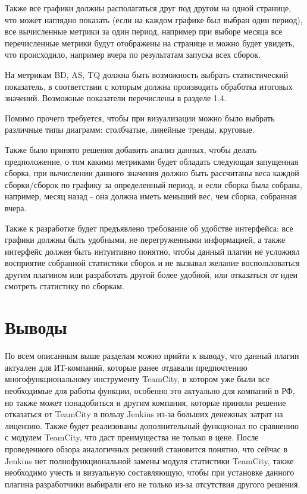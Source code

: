 Также все графики должны располагаться друг под другом на одной странице, что может наглядно показать (если на каждом графике был выбран один период), все вычисленные метрики за один период, например при выборе месяца все перечисленные метрики будут отображены на странице и можно будет увидеть, что происходило, например вчера по результатам запуска всех сборок.

На метрикам BD, AS, TQ должна быть возможность выбрать статистический показатель, в соответствии с которым должна производить обработка итоговых значений. Возможные показатели перечислены в разделе 1.4.

Помимо прочего требуется, чтобы при визуализации можно было выбрать различные типы диаграмм: столбчатые, линейные тренды, круговые.

Также было принято решения добавить анализ данных, чтобы делать предположение, о том какими метриками будет обладать следующая запущенная сборка, при вычислении данного значения должно быть рассчитаны веса каждой сборки/сборок по графику за определенный период, и если сборка была собрана, например, месяц назад - она должна иметь меньший вес, чем сборка, собранная вчера.

Также к разработке будет предъявлено требование об удобстве интерфейса: все графики должны быть удобными, не перегруженными информацией, а также интерфейс должен быть интуитивно понятно, чтобы данный плагин не усложнял восприятие собранной статистики сборок и не вызывал желание воспользоваться другим плагином или разработать другой более удобной, или отказаться от идеи смотреть статистику по сборкам.

\section{Выводы} \label{ch1:sec7}

По всем описанным выше разделам можно прийти к выводу, что данный плагин актуален для ИТ-компаний, которые ранее отдавали предпочтению многофункциональному инструменту TeamCity, в котором уже были все необходимые для работы функции, особенно это актуально для компаний в РФ, но также может понадобиться и другим компания, которые приняли решение отказаться от TeamCity в пользу Jenkins из-за больших денежных затрат на лицензию. Также будет реализованы дополнительный функционал по сравнению с модулем TeamCity, что даст преимущества не только в цене. После проведенного обзора аналогичных решений становится понятно, что сейчас в Jenkins нет полнофункциональной замены модуля статистики TeamCity, также необходимо учесть и визуальную составляющую, чтобы при установке данного плагина разработчики выбирали его не только из-за отсутствия другого решения.














